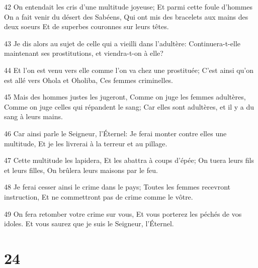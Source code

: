 \par 42 On entendait les cris d'une multitude joyeuse; Et parmi cette foule d'hommes On a fait venir du désert des Sabéens, Qui ont mis des bracelets aux mains des deux soeurs Et de superbes couronnes sur leurs têtes.
\par 43 Je dis alors au sujet de celle qui a vieilli dans l'adultère: Continuera-t-elle maintenant ses prostitutions, et viendra-t-on à elle?
\par 44 Et l'on est venu vers elle comme l'on va chez une prostituée; C'est ainsi qu'on est allé vers Ohola et Oholiba, Ces femmes criminelles.
\par 45 Mais des hommes justes les jugeront, Comme on juge les femmes adultères, Comme on juge celles qui répandent le sang; Car elles sont adultères, et il y a du sang à leurs mains.
\par 46 Car ainsi parle le Seigneur, l'Éternel: Je ferai monter contre elles une multitude, Et je les livrerai à la terreur et au pillage.
\par 47 Cette multitude les lapidera, Et les abattra à coups d'épée; On tuera leurs fils et leurs filles, On brûlera leurs maisons par le feu.
\par 48 Je ferai cesser ainsi le crime dans le pays; Toutes les femmes recevront instruction, Et ne commettront pas de crime comme le vôtre.
\par 49 On fera retomber votre crime sur vous, Et vous porterez les péchés de vos idoles. Et vous saurez que je suis le Seigneur, l'Éternel.

\chapter{24}

